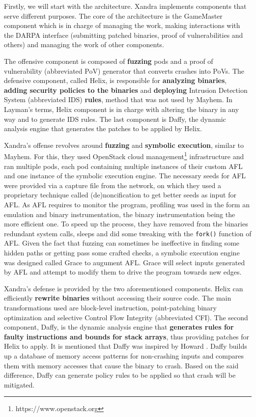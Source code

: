 \documentclass[12pt,a4paper,english,onecolumn]{IEEEtran}
\begin{document}
Firstly, we will start with the architecture. Xandra implements components that serve different purposes. The core of the architecture is the GameMaster component which is in charge of managing the work, making interactions with the DARPA interface (submitting patched binaries, proof of vulnerabilities and others) and managing the work of other components.

The offensive component is composed of \textbf{fuzzing} pods and a proof of vulnerability (abbreviated PoV) generator that converts crashes into PoVs. The defensive component, called Helix, is responsible for \textbf{analyzing binaries}, \textbf{adding security policies to the binaries} and \textbf{deploying} Intrusion Detection System (abbreviated IDS) \textbf{rules}, method that was not used by Mayhem. In Layman's terms, Helix component is in charge with altering the binary in any way and to generate IDS rules. The last component is Daffy, the dynamic analysis engine that generates the patches to be applied by Helix.

Xandra's offense revolves around \textbf{fuzzing} and \textbf{symbolic execution}, similar to Mayhem. For this, they used OpenStack cloud management\footnote{https://www.openstack.org} infrastructure and ran multiple pods, each pod containing multiple instances of their custom AFL and one instance of the symbolic execution engine. The necessary seeds for AFL were provided via a capture file from the network, on which they used a proprietary technique called (de)noncification to get better seeds as input for AFL. As AFL requires to monitor the program, profiling was used in the form an emulation and binary instrumentation, the binary instrumentation being the more efficient one. To speed up the process, they have removed from the binaries redundant system calls, sleeps and did some tweaking with the \texttt{fork()} function of AFL. Given the fact that fuzzing can sometimes be ineffective in finding some hidden paths or getting pass some crafted checks, a symbolic execution engine was designed called Grace to augument AFL. Grace will select inputs generated by AFL and attempt to modify them to drive the program towards new edges. 

Xandra's defense is provided by the two aforementioned components. Helix can efficiently \textbf{rewrite binaries} without accessing their source code. The main transformations used are block-level instruction, point-patching binary optimization and selective Control Flow Integrity (abbreviated CFI). The second component, Daffy, is the dynamic analysis engine that \textbf{generates rules for faulty instructions and bounds for stack arrays}, thus providing patches for Helix to apply. It is mentioned that Daffy was inspired by Howard \cite{howard}. Daffy builds up a database of memory access patterns for non-crashing inputs and compares them with memory accesses that cause the binary to crash. Based on the said difference, Daffy can generate policy rules to be applied so that crash will be mitigated.
\end{document}
